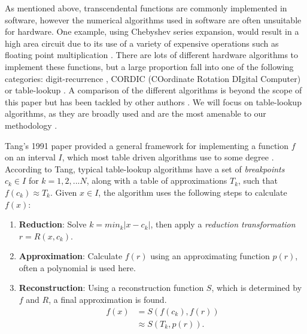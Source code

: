 \documentclass{fac}
\newcommand{\abs}[1]{\lvert#1\rvert}
\begin{document}
As mentioned above, transcendental functions are commonly implemented in software, however the numerical algorithms used in software are often unsuitable for hardware. One example, using Chebyshev series expansion, would result in a high area circuit due to its use of a variety of expensive operations such as floating point multiplication \cite{fowkes1993hardware}. There are lots of different hardware algorithms to implement these functions, but a large proportion fall into one of the following categories: digit-recurrence \cite{bajard1994bkm,1030708}, CORDIC  (COordinate Rotation DIgital Computer) \cite{volder1959cordic,andraka1998survey,10.1145/1478786.1478840} or table-lookup \cite{tang1991table,story1999new}. A comparison of the different algorithms is beyond the scope of this paper but has been tackled by other authors \cite{tang1991table,pineiro2004algorithm}. We will focus on table-lookup algorithms, as they are broadly used and are the most amenable to our methodology .

Tang's 1991 paper provided a general framework for implementing a function $f$ on an interval $I$, which most table driven algorithms use to some degree \cite{tang1991table}. According to Tang, typical table-lookup algorithms have a set of \textit{breakpoints} $c_k \in I$ for $k=1, 2, ... N$, along with a table of approximations $T_k$, such that $f(c_k) \approx T_k$. Given $x \in I$, the algorithm uses the following steps to calculate $f(x)$:
\begin{enumerate}

\item \textbf{Reduction}: Solve $k = min_k \abs{x-c_k}$, then apply a \textit{reduction transformation} $r = R(x,c_k)$.

\item \textbf{Approximation}: Calculate $f(r)$ using an approximating function $p(r)$, often a polynomial is used here.

\item \textbf{Reconstruction}: Using a reconstruction function $S$, which is determined by $f$ and $R$, a final approximation is found.
\begin{align*}
    f(x) &= S(f(c_k),f(r)) \\
         &\approx S(T_k,p(r)).
\end{align*}

\end{enumerate} 
\end{document}
